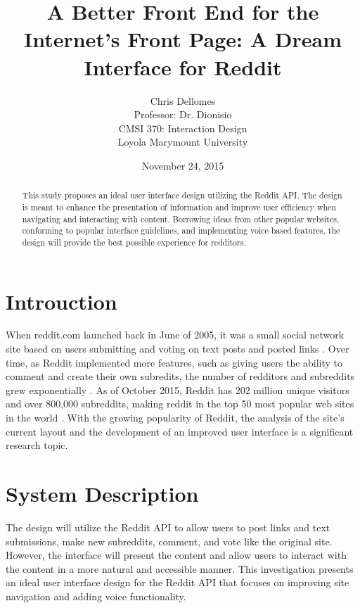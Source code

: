 \documentclass{article}
\begin{document}
\title{A Better Front End for the Internet's Front Page: A Dream Interface for Reddit}
\author{Chris Dellomes\\
Professor: Dr. Dionisio\\
CMSI 370: Interaction Design\\
	Loyola Marymount University}

\date{November 24, 2015}

\maketitle

\begin{center}
\begin{abstract}
\noindent This study proposes an ideal user interface design utilizing the Reddit API. The design is meant to  enhance the presentation of information and improve user efficiency when navigating and interacting with content. Borrowing ideas from other popular websites, conforming to popular interface guidelines, and implementing voice based features, the design will provide the best possible experience for redditors.
\end{abstract}
\end{center}

\thispagestyle{empty}

\clearpage

\setcounter{page}{1}

\section{Introuction} When reddit.com launched back in June of 2005, it was a small social network site based on users submitting and voting on text posts and posted links \cite{DMR}. Over time, as Reddit implemented more features, such as giving users the ability to comment and create their own subredits, the number of redditors and subreddits grew exponentially \cite{Metrics}. As of October 2015, Reddit has 202 million unique visitors and over 800,000 subreddits, making reddit in the top 50 most popular web sites in the world \cite{Alexa, Reddit}. With the growing popularity of Reddit, the analysis of the site's current layout and the development of an improved user interface is a significant research topic.

\section{System Description} The design will utilize the Reddit API to allow users to post links and text submissions, make new subreddits, comment, and vote like the original site. However, the interface will present the content and allow users to interact with the content in a more natural and accessible manner. This investigation presents an ideal user interface design for the Reddit API that focuses on improving site navigation and adding voice functionality.
\end{document}
